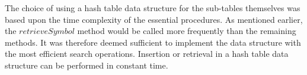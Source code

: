 The choice of using a hash table data structure for the sub-tables themselves was based upon the time complexity of the essential procedures.
As mentioned earlier, the $retrieveSymbol$ method would be called more frequently than the remaining methods.
It was therefore deemed sufficient to implement the data structure with the most efficient search operations.
Insertion or retrieval in a hash table data structure can be performed in constant time.
